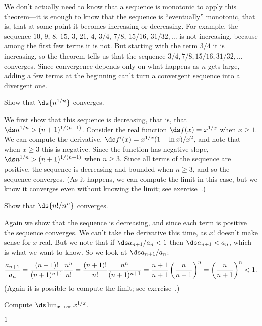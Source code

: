 \begin{theorem}
\begin{theorem}
\begin{theorem}
\begin{theorem}
We don't actually need to know that a sequence is monotonic to apply
this theorem---it is enough to know that the sequence is
``eventually'' monotonic, that is, that at some point it becomes
increasing or decreasing. For example, the sequence $10$, $9$, $8$,
$15$, $3$, $21$, $4$, $3/4$, $7/8$, $15/16$, $31/32,\ldots$ is not
increasing, because among the first few terms it is not. But starting
with the term $3/4$ it is increasing, so the theorem tells us that the
sequence $3/4, 7/8, 15/16, 31/32,\ldots$ converges.  Since convergence
depends only on what happens as $n$ gets large, adding a few
terms at the beginning can't turn a convergent sequence into a
divergent one.

\begin{example}
Show that $\ds\{n^{1/n}\}$ converges. 
\par\nobreak\ssk\noindent
We first show that 
this sequence is decreasing, that is, that $\ds n^{1/n}>
(n+1)^{1/(n+1)}$. Consider the real function $\ds f(x)=x^{1/x}$ when
$x\ge1$. We can compute the derivative, $\ds f'(x)=x^{1/x}(1-\ln x)/x^2$,
and note that when $x\ge 3$ this is negative. Since the function has
negative slope, $\ds n^{1/n}>
(n+1)^{1/(n+1)}$ when $n\ge 3$. Since all terms of the sequence are
positive, the sequence is decreasing and bounded when $n\ge3$, and so
the sequence converges. (As it happens, we can compute the limit in
this case, but we know it converges even without knowing the limit; see
exercise~.)
\end{example}

\begin{example}
Show that $\ds\{n!/n^n\}$ converges.
\par\nobreak\ssk\noindent
Again we show that the sequence is decreasing, and since each term is
positive the sequence converges. We can't take the derivative this
time, as $x!$ doesn't make sense for $x$ real. But we note that if 
$\ds a_{n+1}/a_n < 1$ then $\ds a_{n+1}< a_n$, which is what we want to
know. So we look at $\ds a_{n+1}/a_n$:
$$ 
  {a_{n+1}\over a_n} = {(n+1)!\over (n+1)^{n+1}}{n^n\over n!}=
  {(n+1)!\over n!}{n^n\over (n+1)^{n+1}}=
  {n+1\over n+1}\left({n\over n+1}\right)^n=
  \left({n\over n+1}\right)^n < 1.
$$
(Again it is possible to compute the limit; see
exercise~.)
\end{example}

\begin{exercises}

\begin{exercise} \label{exercise:exponential limit}
Compute $\ds\lim_{x\to\infty} x^{1/x}$.
\begin{answer} $1$
\end{answer}\end{exercise}


\end{exercises}
\end{theorem}
\end{theorem}
\end{theorem}
\end{theorem}
